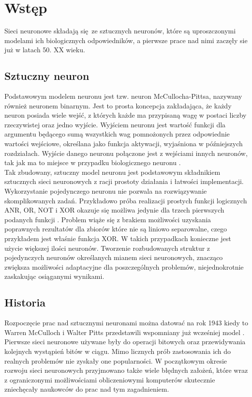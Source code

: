 
\chapter{Wstęp}

Sieci neuronowe składają się ze sztucznych neuronów, które są uproszczonymi modelami ich
biologicznych odpowiedników, a pierwsze prace nad nimi zaczęły sie już w latach 50.
XX wieku.

\section{Sztuczny neuron}

Podstawowym modelem neuronu jest tzw. neuron McCullocha-Pittsa, nazywany
również neuronem binarnym. Jest to prosta koncepcja zakładająca, że każdy neuron
posiada wiele wejść, z których każde ma przypisaną wagę w postaci liczby
rzeczywistej oraz jedno wyjście. Wyjściem neuronu jest wartość funkcji
dla argumentu będącego sumą wszystkich wag pomnożonych przez odpowiednie
wartości wejściowe, określana jako funkcja aktywacji, wyjaśniona w późniejszych rozdziałach.
Wyjście danego neuronu połączone jest z wejściami innych
neuronów, tak jak ma to miejsce w przypadku biologicznego neuronu \cite{CS231n}.\\
Tak zbudowany, sztuczny model neuronu jest podstawowym składnikiem sztucznych sieci
neuronowych z racji prostoty działania i łatwości implementacji.\\
Wykorzystanie pojedynczego neuronu nie pozwala na rozwiązywanie skomplikowanych zadań.
Przykładowo próba realizacji prostych funkcji logicznych ANR, OR, NOT i XOR okazuje
się możliwa jedynie dla trzech pierwszych podanych funkcji \cite{XORproblem}.
Problem wiąże się z brakiem możliwości uzyskania poprawnych rezultatów dla zbiorów które
nie są liniowo separowalne, czego przykładem jest właśnie funkcja XOR. W takich przypadkach
konieczne jest użycie większej ilości neuronów. Tworzenie rozbudowanych struktur z pojedynczych
neuronów określanych mianem sieci neuronowych, znacząco zwiększa możliwości adaptacyjne
dla poszczególnych problemów, niejednokrotnie zaskakując osiąganymi wynikami.

\section{Historia}

Rozpoczęcie prac nad sztucznymi neuronami można datować na rok 1943 kiedy to
Warren McCulloch i Walter Pitts przedstawili wspomniany już wcześniej model \cite{NNbiology}.
Pierwsze sieci neuronowe używane były do operacji bitowych oraz przewidywania kolejnych
wystąpień bitów w ciągu. Mimo licznych prób zastosowania ich do realnych problemów
nie zyskały one popularności. W początkowym okresie rozwoju sieci neuronowych
przyjmowano także wiele błędnych założeń, które wraz z ograniczonymi możliwościami
obliczeniowymi komputerów skutecznie zniechęcały naukowców do prac nad tym zagadnieniem.\\
